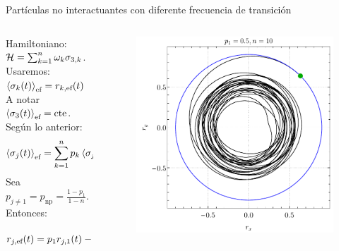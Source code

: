 \begin{frame}{Partículas no interactuantes con diferente frecuencia de transición}
    \begin{columns}
        \begin{column}{0.5\textwidth}
            Hamiltoniano: $\mathcal{H}=\sum_{k=1}^{n}\omega_{k}\sigma_{3,k}$.\\ \pause
            Usaremos: $\expval{\sigma_{k}(t)}_{\text{ef}}=r_{k,\text{ef}}(t)$\\ \pause
            A notar $\expval{\sigma_{3}(t)}_{\text{ef}}=\text{cte}$.\\ \pause
            Según lo anterior:
            \begin{equation}
                \expval{\sigma_{j}(t)}_{\text{ef}}=\sum_{k=1}^{n}p_{k}\expval{\sigma_{j}(t)}_{k}\nonumber
            \end{equation}
            Sea $p_{j\neq 1}=p_{\text{np}}=\frac{1-p_{1}}{1-n}$. Entonces:\pause
            \begin{equation}
                r_{j,\text{ef}}(t)=p_{1}r_{j,1}(t)- p_{\text{np}}r_{\text{np}}\sum_{k=2}^{n}\sin(2\omega_{k} t-\phi_{j})\nonumber
        \end{equation}
        \end{column}
        \pause
        \begin{column}{0.5\textwidth}
            \begin{figure}
                \centering
                \includegraphics[width=1.\textwidth]{figures/maxent_results/local_all_ran_p=0.5_r=0.9_n=10_a=-3_b=3.pdf}
               \end{figure}
        \end{column}
    \end{columns}
\end{frame}
